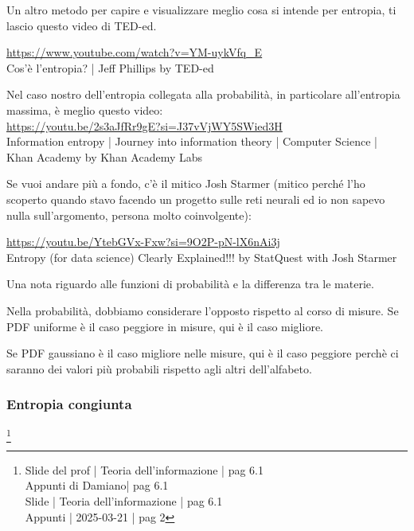 \begin{tcolorbox}
    Un altro metodo per capire e visualizzare meglio cosa si intende per entropia, ti lascio questo video di TED-ed. \newline 

    \url{https://www.youtube.com/watch?v=YM-uykVfq_E}\\
    Cos'è l'entropia? | Jeff Phillips by TED-ed \newline 

    Nel caso nostro dell'entropia collegata alla probabilità, in particolare all'entropia massima, è meglio questo video: \\

    \url{https://youtu.be/2s3aJfRr9gE?si=J37vVjWY5SWied3H}\\ 
    Information entropy | Journey into information theory | Computer Science | Khan Academy by Khan Academy Labs \newline 

    Se vuoi andare più a fondo, c'è il mitico Josh Starmer (mitico perché l'ho scoperto quando stavo facendo un progetto sulle reti neurali ed io non sapevo nulla sull'argomento, persona molto coinvolgente): \newline 

    \url{https://youtu.be/YtebGVx-Fxw?si=9O2P-pN-lX6nAi3j} \\
    Entropy (for data science) Clearly Explained!!! by StatQuest with Josh Starmer \newline 

    Una nota riguardo alle funzioni di probabilità e la differenza tra le materie. \newline

    Nella probabilità, dobbiamo considerare l'opposto rispetto al corso di misure. Se PDF uniforme è il caso peggiore in misure, qui è il caso migliore. \newline 
    
    Se PDF gaussiano è il caso migliore nelle misure, qui è il caso peggiore perchè ci saranno dei valori più probabili rispetto agli altri dell'alfabeto.  
\end{tcolorbox}

\newpage 

\subsubsection{Entropia congiunta}
\footnote{Slide del prof | Teoria dell'informazione | pag 6.1 \\  
Appunti di Damiano| pag 6.1 \\
Slide | Teoria dell'informazione | pag 6.1 \\
Appunti | 2025-03-21 | pag 2
 }

